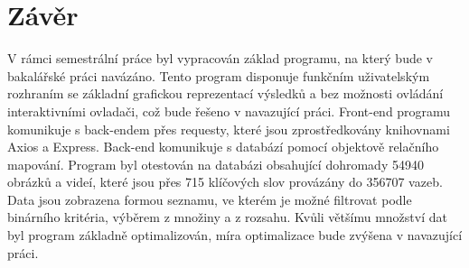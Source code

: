 \chapter*{Závěr}
{}

V rámci semestrální práce byl vypracován základ programu, na který bude v bakalářské práci navázáno. Tento program disponuje funkčním uživatelským rozhraním se základní grafickou reprezentací výsledků a bez možnosti ovládání interaktivními ovladači, což bude řešeno v navazující práci. Front-end programu komunikuje s back-endem přes requesty, které jsou zprostředkovány knihovnami Axios a Express. Back-end komunikuje s databází pomocí objektově relačního mapování. Program byl otestován na databázi obsahující dohromady 54940 obrázků a videí, které jsou přes 715 klíčových slov provázány do 356707 vazeb. Data jsou zobrazena formou seznamu, ve kterém je možné filtrovat podle binárního kritéria, výběrem z množiny a z rozsahu. Kvůli většímu množství dat byl program základně optimalizován, míra optimalizace bude zvýšena v navazující práci.
